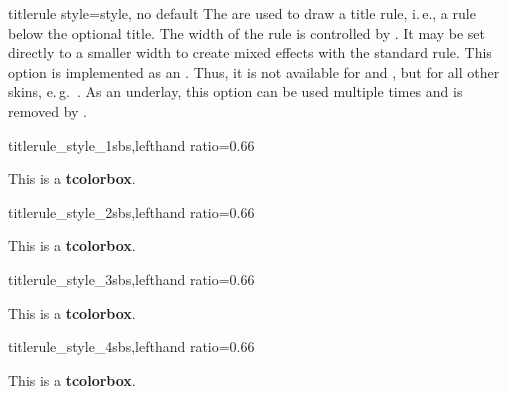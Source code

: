 \clearpage


\begin{docTcbKey}[][doc new=2015-01-14]{titlerule style}{=}{style, no default}
  The  are used to draw a title rule,
  i.\,e., a rule below the optional title. The width of the rule is controlled
  by . It may be set directly to a smaller width
  to create mixed effects with the standard rule.
  This option is implemented as an . Thus, it is not
  available for  and , but for
  all other skins, e.\,g.\ .
  As an underlay, this option can be used multiple times and is removed
  by .
\begin{exdispExample*}{titlerule_style_1}{sbs,lefthand ratio=0.66}
\begin{tcolorbox}[enhanced,
  colback=red!5!white,colframe=red!75!black,
  colbacktitle=red!50!yellow,fonttitle=\bfseries,
  title=My title,
  titlerule=1mm,
  titlerule style=yellow  ]
This is a \textbf{tcolorbox}.
\end{tcolorbox}
\end{exdispExample*}

\begin{exdispExample*}{titlerule_style_2}{sbs,lefthand ratio=0.66}
\begin{tcolorbox}[enhanced,
  colback=red!5!white,colframe=red!75!black,
  colbacktitle=red!50!yellow,fonttitle=\bfseries,
  title=My title,
  titlerule=1mm,
  titlerule style={yellow,line width=0.5mm}  ]
This is a \textbf{tcolorbox}.
\end{tcolorbox}
\end{exdispExample*}

\begin{exdispExample*}{titlerule_style_3}{sbs,lefthand ratio=0.66}
\begin{tcolorbox}[enhanced,
  colback=red!10!white,colframe=red!75!black,
  colbacktitle=red!50!yellow,fonttitle=\bfseries,
  frame hidden,
  title=My title,
  boxrule=0pt,titlerule=1mm,
  titlerule style=red!50!black  ]
This is a \textbf{tcolorbox}.
\end{tcolorbox}
\end{exdispExample*}

\begin{exdispExample*}{titlerule_style_4}{sbs,lefthand ratio=0.66}
\begin{tcolorbox}[empty,
  coltitle=red!75!black,fonttitle=\bfseries,
  borderline horizontal={0.5mm}{0pt}{red!50!white},
  title=My title,
  titlerule style={red,
    arrows = {Hooks[arc=270]-Hooks[arc=270]}} ]
This is a \textbf{tcolorbox}.
\end{tcolorbox}
\end{exdispExample*}
\end{docTcbKey}

